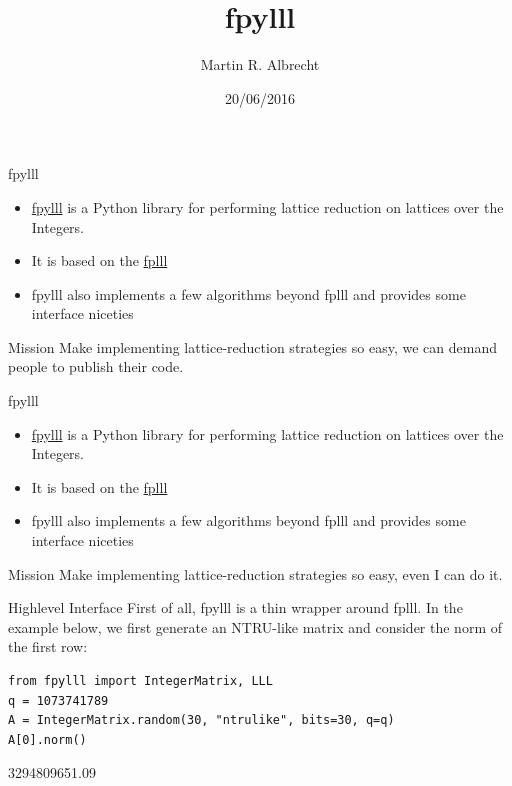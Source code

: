 \documentclass[presentation,smaller]{beamer}
\author{Martin R. Albrecht}
\date{20/06/2016}
\title{fpylll}
\begin{document}
\maketitle

\begin{frame}[label={sec:orgheadline1}]{fpylll}
\begin{itemize}
\item \href{https://github.com/malb/fpylll}{fpylll} is a Python library for performing lattice reduction on lattices over the Integers.
\item It is based on the \href{https://github.com/dstehle/fplll}{fplll}
\item fpylll also implements a few algorithms beyond fplll and provides some interface niceties
\end{itemize}

\begin{block}{Mission}
Make implementing lattice-reduction strategies so easy, we can demand people to publish their code.
\end{block}
\end{frame}

\begin{frame}[label={sec:orgheadline2}]{fpylll}
\begin{itemize}
\item \href{https://github.com/malb/fpylll}{fpylll} is a Python library for performing lattice reduction on lattices over the Integers.
\item It is based on the \href{https://github.com/dstehle/fplll}{fplll}
\item fpylll also implements a few algorithms beyond fplll and provides some interface niceties
\end{itemize}

\begin{block}{Mission}
Make implementing lattice-reduction strategies so easy, even I can do it.
\end{block}
\end{frame}

\begin{frame}[fragile,label={sec:orgheadline3}]{Highlevel Interface}
 First of all, \alert{fpylll} is a thin wrapper around \alert{fplll}. In the example below, we first generate an NTRU-like matrix and consider the norm of the first row:

\lstset{language=Python,label= ,caption= ,captionpos=b,numbers=none}
\begin{lstlisting}
from fpylll import IntegerMatrix, LLL
q = 1073741789
A = IntegerMatrix.random(30, "ntrulike", bits=30, q=q)
A[0].norm()
\end{lstlisting}

3294809651.09
\end{frame}
\end{document}
